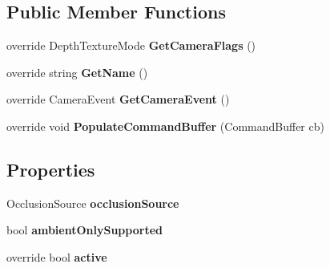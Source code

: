 \subsection*{Public Member Functions}
\begin{DoxyCompactItemize}
\item 
\mbox{\label{class_unity_engine_1_1_post_processing_1_1_ambient_occlusion_component_ad75fa4a0898e2d84ffaa842433864c79}} 
override Depth\+Texture\+Mode {\bfseries Get\+Camera\+Flags} ()
\item 
\mbox{\label{class_unity_engine_1_1_post_processing_1_1_ambient_occlusion_component_a912e17f44f887c19511e31cb4211551c}} 
override string {\bfseries Get\+Name} ()
\item 
\mbox{\label{class_unity_engine_1_1_post_processing_1_1_ambient_occlusion_component_a40c2e1160a63cb63a910d9e232515001}} 
override Camera\+Event {\bfseries Get\+Camera\+Event} ()
\item 
\mbox{\label{class_unity_engine_1_1_post_processing_1_1_ambient_occlusion_component_a5f64f7638a6a441cf4bdaeb54dbf1601}} 
override void {\bfseries Populate\+Command\+Buffer} (Command\+Buffer cb)
\end{DoxyCompactItemize}
\subsection*{Properties}
\begin{DoxyCompactItemize}
\item 
\mbox{\label{class_unity_engine_1_1_post_processing_1_1_ambient_occlusion_component_a383c6904f750ce5bfe1fd0d69a851fe9}} 
Occlusion\+Source {\bfseries occlusion\+Source}
\item 
\mbox{\label{class_unity_engine_1_1_post_processing_1_1_ambient_occlusion_component_a818d8d0378085206d92f401ae73c7234}} 
bool {\bfseries ambient\+Only\+Supported}
\item 
\mbox{\label{class_unity_engine_1_1_post_processing_1_1_ambient_occlusion_component_a5fa0bbd6818c812f5ffb524b6467fb5c}} 
override bool {\bfseries active}
\end{DoxyCompactItemize}
